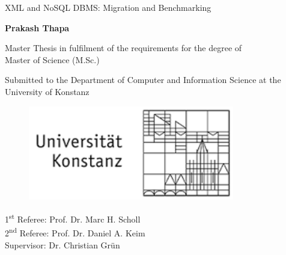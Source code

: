 \documentclass[a4paper,12pt]{book}
\begin{document}
 \begin{huge}
  \begin{center} XML and NoSQL DBMS: Migration and Benchmarking \end{center} 
  \end{huge}
 \hfill \break
 \begin{large}
    \begin{center}\textbf{ \large {Prakash Thapa \\}}\end{center}
 \end{large}

 \begin{small}
\begin{center}Master Thesis in fulfilment of the requirements for the  degree of \\
Master of Science (M.Sc.) \end{center}
 \end{small}
 \begin{small}
\begin{center}
 Submitted to the Department of Computer and Information Science at the \\ University of Konstanz \end{center}
 \end{small}
 \hfill \break

\begin{center}                    
    \begin{figure}[h]
    \centering
    \includegraphics[width=90mm]{img/logo.png} 
    \end{figure}
\end{center}
\begin{center}
 1\textsuperscript{st} Referee: Prof. Dr. Marc H. Scholl \\
 2\textsuperscript{nd} Referee: Prof. Dr. Daniel A. Keim \\ 
  \hfill \break
   \hfill \break
 Supervisor: Dr. Christian Gr{\"u}n
\end{center}



	\renewcommand{\lstlistingname}{Code}
	\thispagestyle{empty}
	\newpage
\end{document}
